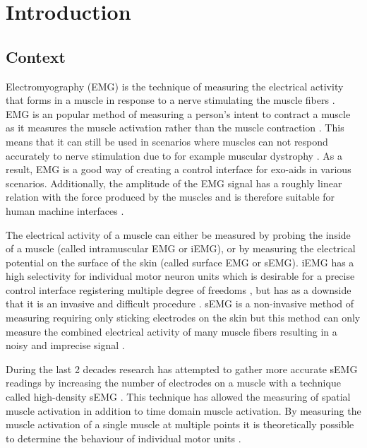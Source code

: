 \chapter{Introduction}
\section{Context}
Electromyography (EMG) is the technique of measuring the electrical activity that forms in a muscle in response to a nerve stimulating the muscle fibers \cite{biomechanics_research_methods} \cite{wikipedia_emg}. EMG is an popular method of measuring a person's intent to contract a muscle as it measures the muscle activation rather than the muscle contraction \cite{control_interfaces_intention_detection}. This means that it can still be used in scenarios where muscles can not respond accurately to nerve stimulation due to for example muscular dystrophy \cite{emg_arm_function_boys_pilot}. As a result, EMG is a good way of creating a control interface for exo-aids in various scenarios. Additionally, the amplitude of the EMG signal has a roughly linear relation with the force produced by the muscles and is therefore suitable for human machine interfaces \cite{adaptive_filter_dry_electrode}.

The electrical activity of a muscle can either be measured by probing the inside of a muscle (called intramuscular EMG or iEMG), or by measuring the electrical potential on the surface of the skin (called surface EMG or sEMG). iEMG has a high selectivity for individual motor neuron units which is desirable for a precise control interface registering multiple degree of freedoms \cite{semg_vs_iemg}, but has as a downside that it is an invasive and difficult procedure \cite{intramuscular_emg_signals}. sEMG is a non-invasive method of measuring requiring only sticking electrodes on the skin but this method can only measure the combined electrical activity of many muscle fibers resulting in a noisy and imprecise signal \cite{wiki:Electromyography}. 

During the last 2 decades research has attempted to gather more accurate sEMG readings by increasing the number of electrodes on a muscle with a technique called high-density sEMG \cite{high_density_semg}. 
This technique has allowed the measuring of spatial muscle activation in addition to time domain muscle activation. By measuring the muscle activation of a single muscle at multiple points it is theoretically possible to determine the behaviour of individual motor units \cite{high_density_semg_clinical_applications}.

